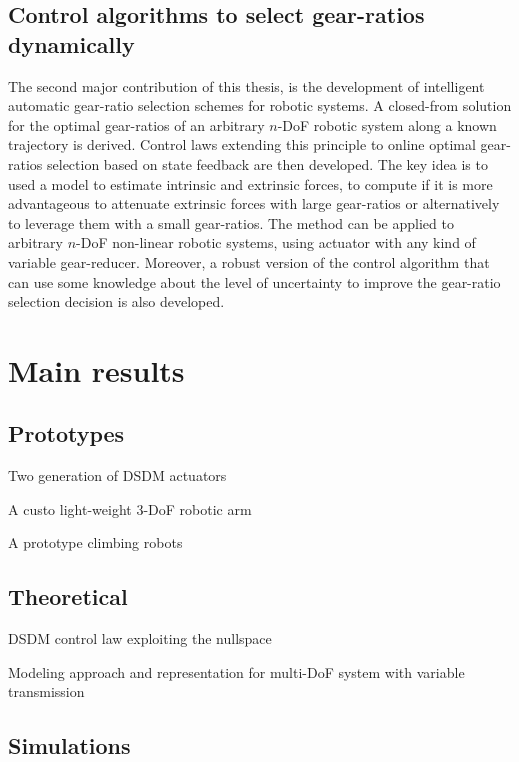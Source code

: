 \subsection{Control algorithms to select gear-ratios dynamically}

The second major contribution of this thesis, is the development of intelligent automatic gear-ratio selection schemes for robotic systems. A closed-from solution for the optimal gear-ratios of an arbitrary $n$-DoF robotic system along a known trajectory is derived. Control laws extending this principle to online optimal gear-ratios selection based on state feedback are then developed. The key idea is to used a model to estimate intrinsic and extrinsic forces, to compute if it is more advantageous to attenuate extrinsic forces with large gear-ratios or alternatively to leverage them with a small gear-ratios. The method can be applied to arbitrary $n$-DoF non-linear robotic systems, using actuator with any kind of variable gear-reducer. Moreover, a robust version of the control algorithm that can use some knowledge about the level of uncertainty to improve the gear-ratio selection decision is also developed.


\section{Main results}
\label{sec:mainresults}



\subsection{Prototypes}

Two generation of DSDM actuators

A custo light-weight 3-DoF robotic arm

A prototype climbing robots


\subsection{Theoretical}

DSDM control law exploiting the nullspace

Modeling approach and representation for multi-DoF system with variable transmission




\subsection{Simulations}


